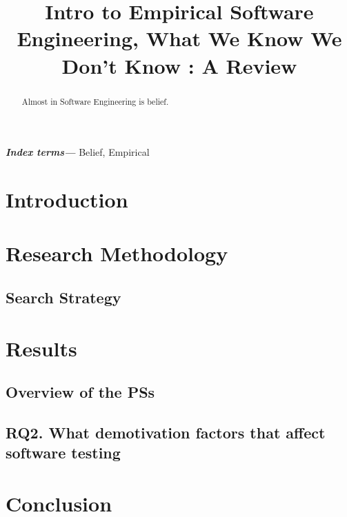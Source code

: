 \documentclass[conference, compsoc, twoside]{IEEEtran}
\begin{document}
\preto\tabular{\setcounter{magicrownumbers}{0}}
\newcommand\rownumber{\stepcounter{magicrownumbers}\arabic{magicrownumbers}}
\title{\Huge Intro to Empirical Software Engineering, What We Know We Don't Know : A Review}
\author{
}

\maketitle
\providecommand{\keywords}[1]{\textbf{\textit{Index terms---}} #1}
\begin{abstract}
Almost in Software Engineering is belief.
\end{abstract}

\keywords{Belief, Empirical}
\IEEEpeerreviewmaketitle

\section{Introduction}

\section{Research Methodology}

\subsection{Search Strategy}

\section{Results}

\subsection{Overview of the PSs}

\subsection{RQ2. What demotivation factors that affect software testing}

\section{Conclusion}


\end{document}
